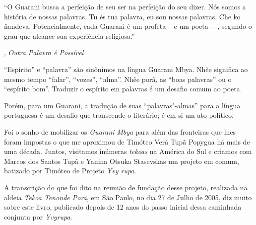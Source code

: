 
 

 

 

\epigraph{``O Guarani busca a perfeição de seu ser na perfeição do seu dizer. Nós
somos a história de nossas palavras. Tu és tua palavra, eu sou nossas
palavras. Che ko ñandeva. Potencialmente, cada Guarani é um profeta -- e
um poeta \mbox{---,} segundo o grau que alcance sua experiência religiosa.''}{, \emph{Outra Palavra é Possível}} 

 

``Espirito'' e ``palavra'' são sinônimos na língua Guarani Mbya.
Nhẽe significa ao mesmo tempo ``falar'', ``vozes'', ``alma''.
Nhẽe porã, as ``boas palavras'' ou o ``espírito bom''.
Traduzir o espírito em palavras é um desafio comum ao poeta.

Porém, para um Guarani, a tradução de suas ``palavras"-almas'' para a
língua portuguesa é um desafio que transcende o literário; é em si um
ato político.

Foi o sonho de mobilizar os \emph{Guarani Mbya} para além das fronteiras
que lhes foram impostas o que me aproximou de Timóteo Verá Tupã Popygua
há mais de uma década. Juntos, visitamos inúmeras \emph{tekoas} na
América do Sul e criamos com Marcos dos Santos Tupã e Yanina Otsuka
Stasevskas um projeto em comum, batizado por Timóteo de
{Projeto} \emph{{Yvy rupa}}.

A transcrição do que foi dito na reunião de fundação desse projeto,
realizada na aldeia \emph{Tekoa Tenonde Porã}, em São Paulo, no dia 27
de Julho de 2005, diz muito sobre este livro, publicado depois de 12 anos do passo inicial dessa caminhada conjunta por \emph{Yvyrupa}.

 

